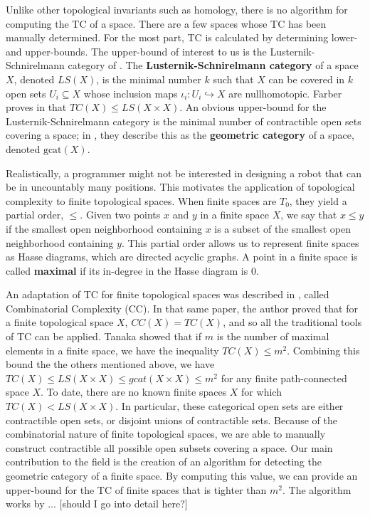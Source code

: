 \documentclass{article}
\begin{document}
Unlike other topological invariants such as homology, there is no algorithm for computing the TC of a space.
There are a few spaces whose TC has been manually determined.
For the most part, TC is calculated by determining lower- and upper-bounds.
The upper-bound of interest to us is the Lusternik-Schnirelmann category of \cite{LS34}.
The \textbf{Lusternik-Schnirelmann category} of a space $X$, denoted ${LS}(X)$, is the minimal number $k$ such that $X$ can be covered in $k$ open sets $U_i \subseteq X$ whose inclusion maps $\iota_i: U_i \hookrightarrow X$ are nullhomotopic.
Farber proves in \cite{Farber2001} that $TC(X) \leq LS(X\times X)$.
An obvious upper-bound for the Lusternik-Schnirelmann category is the minimal number of contractible open sets covering a space; in \cite{Fernandez-Ternero2018}, they describe this as the \textbf{geometric category} of a space, denoted $\text{gcat}(X)$.

Realistically, a programmer might not be interested in designing a robot that can be in uncountably many positions.
This motivates the application of topological complexity to finite topological spaces.
When finite spaces are $T_0$, they yield a partial order, $\leq$. Given two points $x$ and $y$ in a finite space $X$, we say that $x \leq y$ if the smallest open neighborhood containing $x$ is a subset of the smallest open neighborhood containing $y$. This partial order allows us to represent finite spaces as Hasse diagrams, which are directed acyclic graphs. A point in a finite space is called \textbf{maximal} if its in-degree in the Hasse diagram is 0.

An adaptation of TC for finite topological spaces was described in \cite{Tanaka2018}, called Combinatorial Complexity (CC).
In that same paper, the author proved that for a finite topological space $X$, $CC(X) = TC(X)$, and so all the traditional tools of TC can be applied.
Tanaka showed that if $m$ is the number of maximal elements in a finite space, we have the inequality $TC(X) \leq m^2$.
Combining this bound the the others mentioned above, we have $TC(X) \leq LS(X\times X) \leq gcat(X \times X) \leq m^2$ for any finite path-connected space $X$.
To date, there are no known finite spaces $X$ for which $TC(X) < LS(X \times X)$.
In particular, these categorical open sets are either contractible open sets, or disjoint unions of contractible sets.
Because of the combinatorial nature of finite topological spaces, we are able to manually construct contractible all possible open subsets covering a space.
Our main contribution to the field is the creation of an algorithm for detecting the geometric category of a finite space.
By computing this value, we can provide an upper-bound for the TC of finite spaces that is tighter than $m^2$.
The algorithm works by ... [should I go into detail here?]


{}

\end{document}
